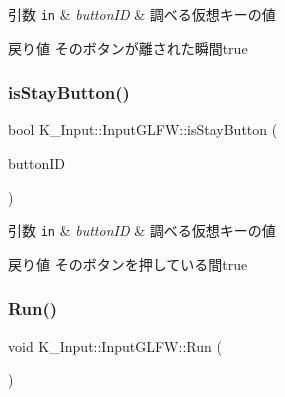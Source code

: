 \begin{DoxyParams}[1]{引数}
\mbox{\tt in}  & {\em button\+ID} & 調べる仮想キーの値 \\
\hline
\end{DoxyParams}
\begin{DoxyReturn}{戻り値}
そのボタンが離された瞬間true 
\end{DoxyReturn}
\mbox{\label{class_k___input_1_1_input_g_l_f_w_afe17965f8cf7f982aa5c207a8df320df}} 
\subsubsection{\texorpdfstring{is\+Stay\+Button()}{isStayButton()}}
{\footnotesize\ttfamily bool K\+\_\+\+Input\+::\+Input\+G\+L\+F\+W\+::is\+Stay\+Button (\begin{DoxyParamCaption}\item[{\mbox{\hyperlink{namespace_k___input_ab1b3c957b1b7070e86ccd1a908f3a101}{Vpad\+Button}}}]{button\+ID }\end{DoxyParamCaption})}


\begin{DoxyParams}[1]{引数}
\mbox{\tt in}  & {\em button\+ID} & 調べる仮想キーの値 \\
\hline
\end{DoxyParams}
\begin{DoxyReturn}{戻り値}
そのボタンを押している間true 
\end{DoxyReturn}
\mbox{\label{class_k___input_1_1_input_g_l_f_w_a2e6aca10a49dfac3a8d49143910e0a2a}} 
\subsubsection{\texorpdfstring{Run()}{Run()}}
{\footnotesize\ttfamily void K\+\_\+\+Input\+::\+Input\+G\+L\+F\+W\+::\+Run (\begin{DoxyParamCaption}{ }\end{DoxyParamCaption})}



